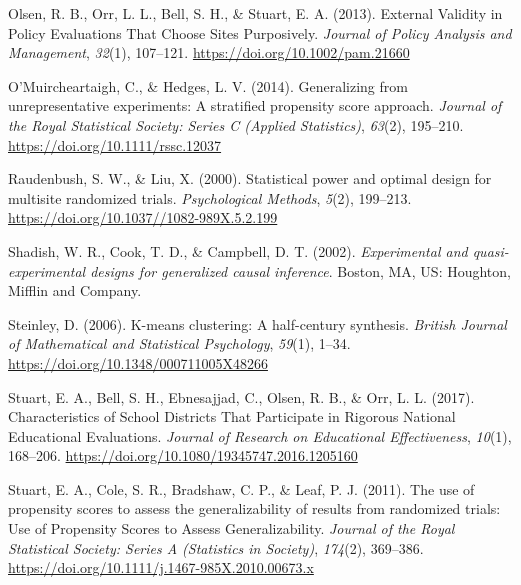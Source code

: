 \documentclass[
  english,
  man,floatsintext]{apa6}
\begin{document}
\leavevmode\hypertarget{ref-olsenExternalValidityPolicy2013}{}%
Olsen, R. B., Orr, L. L., Bell, S. H., \& Stuart, E. A. (2013). External Validity in Policy Evaluations That Choose Sites Purposively. \emph{Journal of Policy Analysis and Management}, \emph{32}(1), 107--121. \url{https://doi.org/10.1002/pam.21660}

\leavevmode\hypertarget{ref-omuircheartaighGeneralizingUnrepresentativeExperiments2014}{}%
O'Muircheartaigh, C., \& Hedges, L. V. (2014). Generalizing from unrepresentative experiments: A stratified propensity score approach. \emph{Journal of the Royal Statistical Society: Series C (Applied Statistics)}, \emph{63}(2), 195--210. \url{https://doi.org/10.1111/rssc.12037}

\leavevmode\hypertarget{ref-raudenbushStatisticalPowerOptimal2000}{}%
Raudenbush, S. W., \& Liu, X. (2000). Statistical power and optimal design for multisite randomized trials. \emph{Psychological Methods}, \emph{5}(2), 199--213. \url{https://doi.org/10.1037//1082-989X.5.2.199}

\leavevmode\hypertarget{ref-shadishExperimentalQuasiexperimentalDesigns2002}{}%
Shadish, W. R., Cook, T. D., \& Campbell, D. T. (2002). \emph{Experimental and quasi-experimental designs for generalized causal inference}. Boston, MA, US: Houghton, Mifflin and Company.

\leavevmode\hypertarget{ref-steinleyKmeansClusteringHalfcentury2006}{}%
Steinley, D. (2006). K-means clustering: A half-century synthesis. \emph{British Journal of Mathematical and Statistical Psychology}, \emph{59}(1), 1--34. \url{https://doi.org/10.1348/000711005X48266}

\leavevmode\hypertarget{ref-stuartCharacteristicsSchoolDistricts2017}{}%
Stuart, E. A., Bell, S. H., Ebnesajjad, C., Olsen, R. B., \& Orr, L. L. (2017). Characteristics of School Districts That Participate in Rigorous National Educational Evaluations. \emph{Journal of Research on Educational Effectiveness}, \emph{10}(1), 168--206. \url{https://doi.org/10.1080/19345747.2016.1205160}

\leavevmode\hypertarget{ref-stuartUsePropensityScores2011}{}%
Stuart, E. A., Cole, S. R., Bradshaw, C. P., \& Leaf, P. J. (2011). The use of propensity scores to assess the generalizability of results from randomized trials: Use of Propensity Scores to Assess Generalizability. \emph{Journal of the Royal Statistical Society: Series A (Statistics in Society)}, \emph{174}(2), 369--386. \url{https://doi.org/10.1111/j.1467-985X.2010.00673.x}
\end{document}
